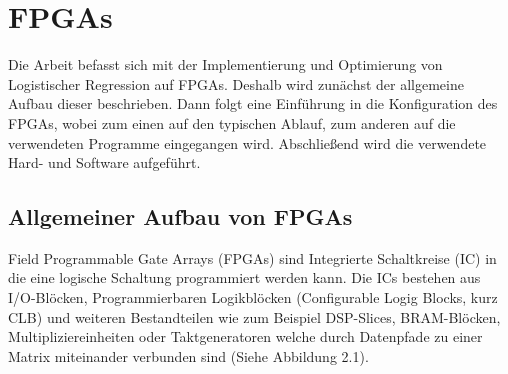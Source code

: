 \chapter{FPGAs}
Die Arbeit befasst sich mit der Implementierung und Optimierung von Logistischer Regression auf FPGAs. Deshalb wird zunächst der allgemeine Aufbau dieser beschrieben. Dann folgt eine Einführung in die Konfiguration des FPGAs, wobei zum einen auf den typischen Ablauf, zum anderen auf die verwendeten Programme eingegangen wird. Abschließend wird die verwendete Hard- und Software aufgeführt.
\section{Allgemeiner Aufbau von FPGAs}
Field Programmable Gate Arrays (FPGAs) sind Integrierte Schaltkreise (IC) in die eine logische Schaltung programmiert werden kann. Die ICs bestehen aus I/O-Blöcken, Programmierbaren Logikblöcken (Configurable Logig Blocks, kurz CLB) und weiteren Bestandteilen wie zum Beispiel DSP-Slices, BRAM-Blöcken, Multipliziereinheiten oder Taktgeneratoren welche durch Datenpfade zu einer Matrix miteinander verbunden sind (Siehe Abbildung 2.1).\\
